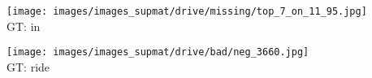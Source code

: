 \documentclass[10pt,twocolumn,letterpaper]{article}
\begin{document}
\begin{figure*}[t]
\begin{minipage}[t]{0.18\textwidth}
       	\centering
    	\texttt{[image: images/images\_supmat/drive/missing/top\_7\_on\_11\_95.jpg]}\\
    	\vspace{0.3ex}
       	GT: in
       	\vspace{0.2ex}
    \end{minipage}
    \hspace{0.005\textwidth}
    \begin{minipage}[t]{0.18\textwidth}
    	\centering
       	\texttt{[image: images/images\_supmat/drive/bad/neg\_3660.jpg]}\\
       	\vspace{0.3ex}
       	GT: ride
       	\vspace{0.2ex}
    \end{minipage}   



\end{figure*}
\end{document}
